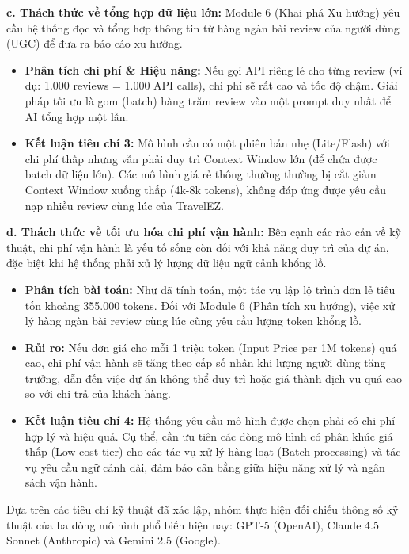 \textbf{c. Thách thức về tổng hợp dữ liệu lớn:} Module 6 (Khai phá Xu hướng) yêu cầu hệ thống đọc và tổng hợp thông tin từ hàng ngàn bài review của người dùng (UGC) để đưa ra báo cáo xu hướng.

\begin{itemize}
    \item \textbf{Phân tích chi phí \& Hiệu năng:} Nếu gọi API riêng lẻ cho từng review (ví dụ: 1.000 reviews = 1.000 API calls), chi phí sẽ rất cao và tốc độ chậm. Giải pháp tối ưu là gom (batch) hàng trăm review vào một prompt duy nhất để AI tổng hợp một lần.
    \item \textbf{Kết luận tiêu chí 3:} Mô hình cần có một phiên bản nhẹ (Lite/Flash) với chi phí thấp nhưng vẫn phải duy trì Context Window lớn (để chứa được batch dữ liệu lớn). Các mô hình giá rẻ thông thường thường bị cắt giảm Context Window xuống thấp (4k-8k tokens), không đáp ứng được yêu cầu nạp nhiều review cùng lúc của TravelEZ.
\end{itemize}


\textbf{d. Thách thức về tối ưu hóa chi phí vận hành:} Bên cạnh các rào cản về kỹ thuật, chi phí vận hành là yếu tố sống còn đối với khả năng duy trì của dự án, đặc biệt khi hệ thống phải xử lý lượng dữ liệu ngữ cảnh khổng lồ.

\begin{itemize}
    \item \textbf{Phân tích bài toán:} Như đã tính toán, một tác vụ lập lộ trình đơn lẻ tiêu tốn khoảng 355.000 tokens. Đối với Module 6 (Phân tích xu hướng), việc xử lý hàng ngàn bài review cùng lúc cũng yêu cầu lượng token khổng lồ.
    \item \textbf{Rủi ro:} Nếu đơn giá cho mỗi 1 triệu token (Input Price per 1M tokens) quá cao, chi phí vận hành sẽ tăng theo cấp số nhân khi lượng người dùng tăng trưởng, dẫn đến việc dự án không thể duy trì hoặc giá thành dịch vụ quá cao so với chi trả của khách hàng.
    \item \textbf{Kết luận tiêu chí 4:} Hệ thống yêu cầu mô hình được chọn phải có chi phí hợp lý và hiệu quả. Cụ thể, cần ưu tiên các dòng mô hình có phân khúc giá thấp (Low-cost tier) cho các tác vụ xử lý hàng loạt (Batch processing) và tác vụ yêu cầu ngữ cảnh dài, đảm bảo cân bằng giữa hiệu năng xử lý và ngân sách vận hành.
\end{itemize}


Dựa trên các tiêu chí kỹ thuật đã xác lập, nhóm thực hiện đối chiếu thông số kỹ thuật của ba dòng mô hình phổ biến hiện nay: GPT-5 (OpenAI), Claude 4.5 Sonnet (Anthropic) và Gemini 2.5 (Google).

